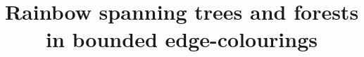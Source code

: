 \documentclass[english]{yupin-notes}
\title{Rainbow spanning trees and forests in bounded edge-colourings}
\author{}
\date{}
\numberwithin{equation}{section}
\begin{document}
\maketitle
\begin{abstract}

\end{abstract}
\tableofcontents















\end{document}
